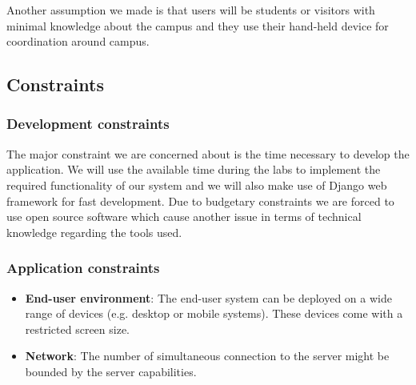 \documentclass{sig-alt-release2}
\begin{document}
Another assumption we made is that users will be students or visitors with 
minimal knowledge about the campus and they use their hand-held device for 
coordination around campus.

\subsection{Constraints}

\subsubsection{Development constraints}

The major constraint we are concerned about is the time necessary to develop 
the application. We will use the available time during the labs to implement 
the required functionality of our system and we will also make use of Django 
web framework for fast development. Due to budgetary constraints we are forced 
to use open source software which cause another issue in terms of technical 
knowledge regarding the tools used.

\subsubsection{Application constraints}
\begin{itemize} \itemsep1pt \parskip0pt 
	\item \textbf{End-user environment}: The end-user system can be deployed
	on a wide range of devices (e.g. desktop or mobile systems). These devices
	come with a restricted screen size.
	\item \textbf{Network}: The number of simultaneous connection to the server
	might be bounded by the server capabilities.
\end{itemize}
\end{document}
